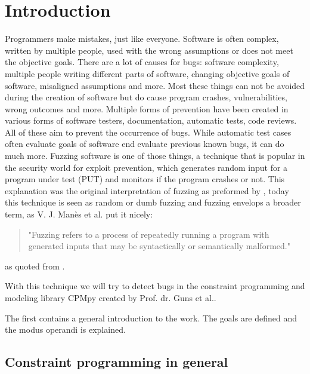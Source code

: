 \chapter{Introduction}
\label{cha:intro}
Programmers make mistakes, just like everyone.
Software is often complex, written by multiple people, used with the wrong assumptions or does not meet the objective goals. 
There are a lot of causes for bugs: software complexity, multiple people writing different parts of software, changing objective goals of software, misaligned assumptions and more. Most these things can not be avoided during the creation of software but do cause program crashes, vulnerabilities, wrong outcomes and more.
Multiple forms of prevention have been created in various forms of software testers, documentation, automatic tests, code reviews. All of these aim to prevent the occurrence of bugs. While automatic test cases often evaluate goals of software end evaluate previous known bugs, it can do much more.
Fuzzing software is one of those things, a technique that is popular in the security world for exploit prevention, which generates random input for a program under test (PUT) and monitors if the program crashes or not. This explanation was the original interpretation of fuzzing as preformed by \cite{4originalFuzzingUnixUtils}, today this technique is seen as random or dumb fuzzing and fuzzing envelops a broader term, as V. J. Man\`es et al.\cite{13manes2019survey} put it nicely:
\begin{quote}
"Fuzzing refers to a process of repeatedly running a program with generated inputs that may be syntactically or semantically malformed."
\end{quote} as quoted from \cite{13manes2019survey}.

With this technique we will try to detect bugs in the constraint programming and modeling library CPMpy \cite{17guns2019increasing} created by Prof. dr. Guns et al..


The first contains a general introduction to the work. 
The goals are defined and the modus operandi is explained.


\section{Constraint programming in general}

